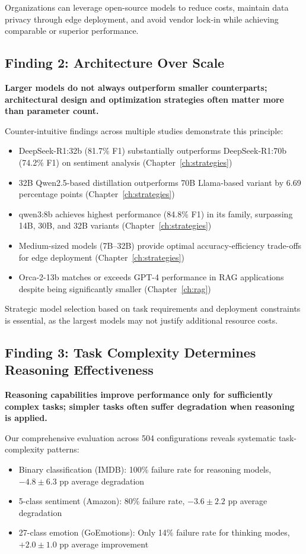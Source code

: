 Organizations can leverage open-source models to reduce costs, maintain data privacy through edge deployment, and avoid vendor lock-in while achieving comparable or superior performance.

\subsection{Finding 2: Architecture Over Scale}

\textbf{Larger models do not always outperform smaller counterparts; architectural design and optimization strategies often matter more than parameter count.}

Counter-intuitive findings across multiple studies demonstrate this principle:
\begin{itemize}[leftmargin=*]
    \item DeepSeek-R1:32b (81.7\% F1) substantially outperforms DeepSeek-R1:70b (74.2\% F1) on sentiment analysis (Chapter~\ref{ch:strategies})
    \item 32B Qwen2.5-based distillation outperforms 70B Llama-based variant by 6.69 percentage points (Chapter~\ref{ch:strategies})
    \item qwen3:8b achieves highest performance (84.8\% F1) in its family, surpassing 14B, 30B, and 32B variants (Chapter~\ref{ch:strategies})
    \item Medium-sized models (7B--32B) provide optimal accuracy-efficiency trade-offs for edge deployment (Chapter~\ref{ch:strategies})
    \item Orca-2-13b matches or exceeds GPT-4 performance in RAG applications despite being significantly smaller (Chapter~\ref{ch:rag})
\end{itemize}

Strategic model selection based on task requirements and deployment constraints is essential, as the largest models may not justify additional resource costs.

\subsection{Finding 3: Task Complexity Determines Reasoning Effectiveness}

\textbf{Reasoning capabilities improve performance only for sufficiently complex tasks; simpler tasks often suffer degradation when reasoning is applied.}

Our comprehensive evaluation across 504 configurations reveals systematic task-complexity patterns:
\begin{itemize}[leftmargin=*]
    \item Binary classification (IMDB): 100\% failure rate for reasoning models, $-4.8 \pm 6.3$ pp average degradation
    \item 5-class sentiment (Amazon): 80\% failure rate, $-3.6 \pm 2.2$ pp average degradation
    \item 27-class emotion (GoEmotions): Only 14\% failure rate for thinking modes, $+2.0 \pm 1.0$ pp average improvement
\end{itemize}

